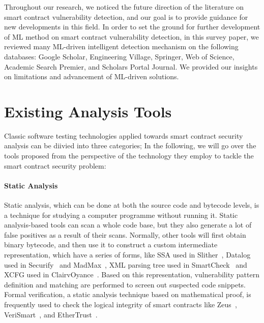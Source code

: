 Throughout our research, we noticed the future direction of the literature on smart contract vulnerability detection, and our goal is to provide guidance for new developments in this field.
In order to set the ground for further development of ML method on smart contract vulnerability detection, in this survey paper, we reviewed many ML-driven intelligent detection mechanism on the following databases: Google Scholar, Engineering Village, Springer, Web of Science, Academic Search Premier, and Scholars Portal Journal.
We provided our insights on limitations and advancement of ML-driven solutions.


\section{Existing Analysis Tools}

Classic software testing technologies applied towards smart contract security analysis can be diivied into three categories; In the following, we will go over the tools proposed from the perspective of the technology they employ to tackle the smart contract security problem:

\paragraph{Static Analysis}
Static analysis, which can be done at both the source code and bytecode levels, is a technique for studying a computer programme without running it.
Static analysis-based tools can scan a whole code base, but they also generate a lot of false positives as a result of their scans.
Normally, other tools will first obtain binary bytecode, and then use it to construct a custom intermediate representation, which have a series of forms, like SSA used in Slither~\cite{slither}, Datalog used in Securify~\cite{securify} and MadMax~\cite{madmax}, XML parsing tree used in SmartCheck~\cite{smartcheck} and XCFG used in ClairvOyance~\cite{ClairvOyance}.
Based on this representation, vulnerability pattern definition and matching are performed to screen out suspected code snippets.
Formal verification, a static analysis technique based on mathematical proof, is frequently used to check the logical integrity of smart contracts like Zeus~\cite{kalra2018zeus}, VeriSmart~\cite{verismart}, and EtherTrust~\cite{etehrTrust}.

